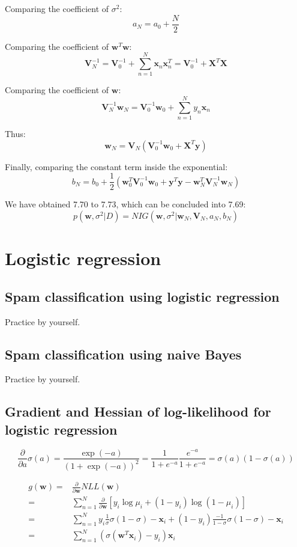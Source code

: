 \documentclass[UTF8]{ctexart}
\begin{document}
Comparing the coefficient of $\sigma^{2}$:
$$a_{N}=a_{0}+\frac{N}{2}$$

Comparing the coefficient of $\textbf{w}^{T}\textbf{w}$:
$$\textbf{V}_{N}^{-1}=\textbf{V}_{0}^{-1}+\sum_{n=1}^{N}\textbf{x}_{n}\textbf{x}_{n}^{T}=\textbf{V}_{0}^{-1}+\textbf{X}^{T}\textbf{X}$$

Comparing the coefficient of $\textbf{w}$:
$$\textbf{V}_{N}^{-1}\textbf{w}_{N}=\textbf{V}_{0}^{-1}\textbf{w}_{0}+\sum_{n=1}^{N}y_{n}\textbf{x}_{n}$$

Thus:
$$\textbf{w}_{N}=\textbf{V}_{N}(\textbf{V}_{0}^{-1}\textbf{w}_{0}+\textbf{X}^{T}\textbf{y})$$

Finally, comparing the constant term inside the exponential:
$$b_{N}=b_{0}+\frac{1}{2}(\textbf{w}_{0}^{T}\textbf{V}_{0}^{-1}\textbf{w}_{0}+\textbf{y}^{T}\textbf{y}-\textbf{w}_{N}^{T}\textbf{V}_{N}^{-1}\textbf{w}_{N})$$

We have obtained 7.70 to 7.73, which can be concluded into 7.69:
$$p(\textbf{w},\sigma^{2}|D)=NIG(\textbf{w},\sigma^{2}|\textbf{w}_{N},\textbf{V}_{N},a_{N},b_{N})$$

\newpage
\section{Logistic regression}
\subsection{Spam classification using logistic regression}
Practice by yourself.

\subsection{Spam classification using naive Bayes}
Practice by yourself.

\subsection{Gradient and Hessian of log-likelihood for logistic regression}
$$\frac{\partial}{\partial a} \sigma(a) = \frac{\exp(-a)}{(1+\exp(-a))^{2}} = \frac{1}{1+e^{-a}}\frac{e^{-a}}{1+e^{-a}}=\sigma(a)(1-\sigma(a))$$

\begin{align}
g(\textbf{w})=&\frac{\partial}{\partial \textbf{w}}NLL(\textbf{w})\nonumber \\
=&\sum_{n=1}^{N}\frac{\partial}{\partial \textbf{w}} [y_{i}\log \mu_{i} + (1-y_{i})\log (1-\mu_{i})]\nonumber \\
=&\sum_{n=1}^{N}y_{i}\frac{1}{\sigma}\sigma(1-\sigma)-\textbf{x}_{i}+(1-y_{i})\frac{-1}{1-\sigma}\sigma(1-\sigma)-\textbf{x}_{i}\nonumber \\
=&\sum_{n=1}^{N}(\sigma(\textbf{w}^{T}\textbf{x}_{i})-y_{i})\textbf{x}_{i}\nonumber
\end{align}
\end{document}
